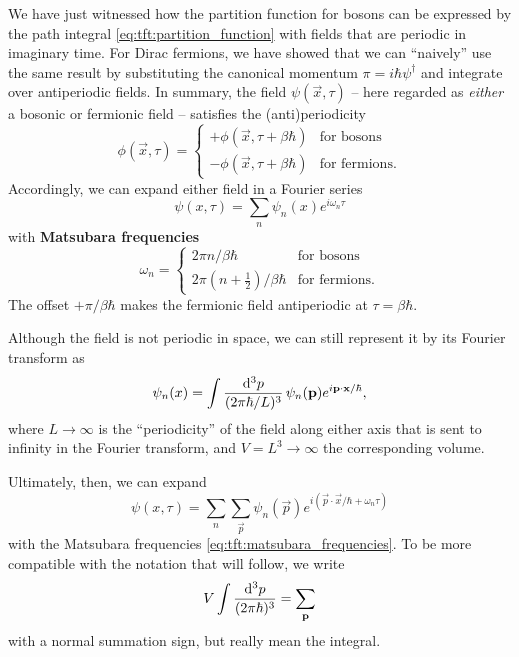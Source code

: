 We have just witnessed how the partition function for bosons can be expressed by the path integral \eqref{eq:tft:partition_function} with fields that are periodic in imaginary time.
For Dirac fermions, we have showed that we can ``naively'' use the same result by substituting the canonical momentum $\pi = i \hbar \psi^\dagger$ and integrate over antiperiodic fields.
In summary, the field $\psi(\vec{x}, \tau)$ -- here regarded as \emph{either} a bosonic or fermionic field -- satisfies the (anti)periodicity
\begin{equation}
	\phi(\vec{x}, \tau) = \begin{cases}
						      + \phi(\vec{x}, \tau + \beta \hbar) & \text{for bosons} \\
						      - \phi(\vec{x}, \tau + \beta \hbar) & \text{for fermions} .
	                      \end{cases}
\end{equation}
Accordingly, we can expand either field in a Fourier series
\begin{equation}
	\psi(x, \tau) = \sum_n \psi_n(x) e^{i \omega_n \tau}
\end{equation}
with \textbf{Matsubara frequencies} 
\begin{equation}
	\omega_n = \begin{cases}
			       2 \pi n / \beta \hbar    & \text{for bosons} \\
				   2 \pi (n+\frac12) / \beta \hbar & \text{for fermions} .
	           \end{cases}
\label{eq:tft:matsubara_frequencies}
\end{equation}
The offset $+\pi / \beta \hbar$ makes the fermionic field antiperiodic at $\tau = \beta \hbar$.

Although the field is not periodic in space, we can still represent it by its Fourier transform as
\begin{equation}
	\psi_n(x) = \int \frac{\mathop{}\!\mathrm{d}^3 p}{(2 \pi \hbar / L)^3} \, \psi_n(\mathbf{p}) e^{i \mathbf{p} \cdot \mathbf{x} / \hbar},
\end{equation}
where $L \rightarrow \infty$ is the ``periodicity'' of the field along either axis that is sent to infinity in the Fourier transform, and $V = L^3 \rightarrow \infty$ the corresponding volume.

Ultimately, then, we can expand
\begin{equation}
	\psi(x, \tau) = \sum_n \sum_\vec{p} \psi_n(\vec{p}) e^{i (\vec{p} \cdot \vec{x} / \hbar + \omega_n \tau)}
\end{equation}
with the Matsubara frequencies \eqref{eq:tft:matsubara_frequencies}.
To be more compatible with the notation that will follow, we write
\begin{equation}
	V \int \frac{\mathop{}\!\mathrm{d}^3 p}{(2 \pi \hbar)^3} = \sum_{\mathbf{p}}
\end{equation}
with a normal summation sign, but really mean the integral.


